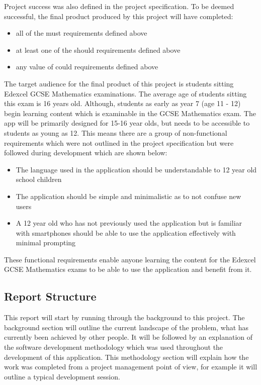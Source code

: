\documentclass{article}
\begin{document}
Project success was also defined in the project specification. To be deemed successful, the final product produced by this project will have completed: 

\begin{itemize}
	\item all of the must requirements defined above
	\item at least one of the should requirements defined above
	\item any value of could requirements defined above
\end{itemize}

The target audience for the final product of this project is students sitting Edexcel GCSE Mathematics examinations. The average age of students sitting this exam is 16 years old. Although, students as early as year 7 (age 11 - 12) begin learning content which is examinable in the GCSE Mathematics exam. The app will be primarily designed for 15-16 year olds, but needs to be accessible to students as young as 12. This means there are a group of non-functional requirements which were not outlined in the project specification but were followed during development which are shown below: 

\begin{itemize}
	\item The language used in the application should be understandable to 12 year old school children
	\item The application should be simple and minimalistic as to not confuse new users
	\item A 12 year old who has not previously used the application but is familiar with smartphones should be able to use the application effectively with minimal prompting
\end{itemize}

These functional requirements enable anyone learning the content for the Edexcel GCSE Mathematics exams to be able to use the application and benefit from it.


\subsection{Report Structure}

This report will start by running through the background to this project. The background section will outline the current landscape of the problem, what has currently been achieved by other people. It will be followed by an explanation of the software development methodology which was used throughout the development of this application. This methodology section will explain how the work was completed from a project management point of view, for example it will outline a typical development session. \\
\end{document}
